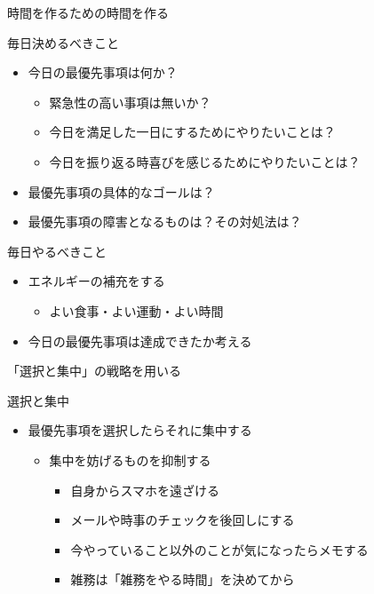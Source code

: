 \documentclass[dvipdfmx]{beamer}
\theoremstyle{example}
\begin{document}
\begin{frame}[t]{時間を作るための時間を作る}
  \begin{block}{毎日決めるべきこと}
    \begin{itemize}
      \item 今日の最優先事項は何か？
      \begin{itemize}
        \item 緊急性の高い事項は無いか？
        \item 今日を満足した一日にするためにやりたいことは？
        \item 今日を振り返る時喜びを感じるためにやりたいことは？
      \end{itemize}
      \item 最優先事項の具体的なゴールは？
      \item 最優先事項の障害となるものは？その対処法は？
    \end{itemize}
  \end{block}

  \begin{exampleblock}{毎日やるべきこと}
    \begin{itemize}
      \item エネルギーの補充をする
      \begin{itemize}
        \item よい食事・よい運動・よい時間
      \end{itemize}
      \item 今日の最優先事項は達成できたか考える
    \end{itemize}
  \end{exampleblock}
\end{frame}

\begin{frame}{「選択と集中」の戦略を用いる}
  \begin{block}{選択と集中}
    \begin{itemize}
      \item 最優先事項を選択したらそれに集中する
      \begin{itemize}
        \item 集中を妨げるものを抑制する
        \begin{itemize}
          \item 自身からスマホを遠ざける
          \item メールや時事のチェックを後回しにする
          \item 今やっていること以外のことが気になったらメモする
          \item 雑務は「雑務をやる時間」を決めてから
        \end{itemize}
      \end{itemize}
    \end{itemize}
  \end{block}
\end{frame}
\end{document}

